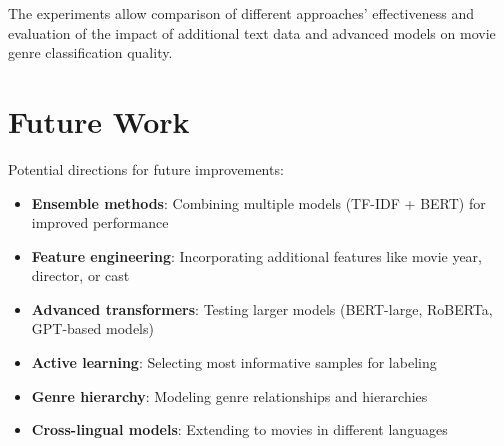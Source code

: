 \documentclass[12pt,a4paper]{article}
\begin{document}
The experiments allow comparison of different approaches' effectiveness and evaluation of the impact of additional text data and advanced models on movie genre classification quality.

\section{Future Work}

Potential directions for future improvements:

\begin{itemize}
    \item \textbf{Ensemble methods}: Combining multiple models (TF-IDF + BERT) for improved performance
    \item \textbf{Feature engineering}: Incorporating additional features like movie year, director, or cast
    \item \textbf{Advanced transformers}: Testing larger models (BERT-large, RoBERTa, GPT-based models)
    \item \textbf{Active learning}: Selecting most informative samples for labeling
    \item \textbf{Genre hierarchy}: Modeling genre relationships and hierarchies
    \item \textbf{Cross-lingual models}: Extending to movies in different languages
\end{itemize}
\end{document}
